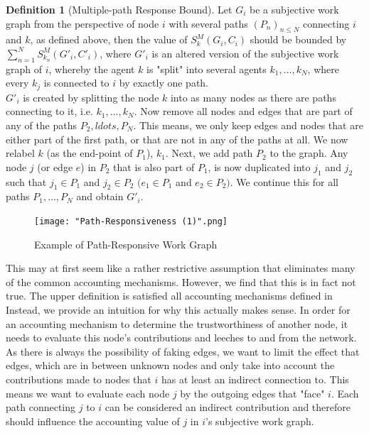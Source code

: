 \documentclass[11pt,a4paper]{report}
\theoremstyle{definition}
\newtheorem{definition}{Definition}[section]
\theoremstyle{theorem}
\theoremstyle{proposition}
\theoremstyle{corollary}
\theoremstyle{lemma}
\theoremstyle{example}
\theoremstyle{remark}
\begin{document}
\begin{definition}[Multiple-path Response Bound]
Let $G_i$ be a subjective work graph from the perspective of node $i$ with several paths $(P_n)_{n\leq{}N}$ connecting $i$ and $k$, as defined above, then the value of $S^M_k(G_i,C_i)$ should be bounded by $\sum\limits_{n=1}^{N}S^M_{k_n}(G'_i,C'_i)$, where $G'_i$ is an altered version of the subjective work graph of $i$, whereby the agent $k$ is "split" into several agents $k_{1},\ldots,k_{N}$, where every $k_j$ is connected to $i$ by exactly one path. \vspace{1em}\\

\noindent{}$G'_i$ is created by splitting the node $k$ into as many nodes as there are paths connecting to it, i.e. $k_1,\ldots,k_N$. Now remove all nodes and edges that are part of any of the paths $P_2,ldots,P_N$. This means, we only keep edges and nodes that are either part of the first path, or that are not in any of the paths at all. We now relabel $k$ (as the end-point of $P_1$), $k_1$. Next, we add path $P_2$ to the graph. Any node $j$ (or edge $e$) in $P_2$ that is also part of $P_1$, is now duplicated into $j_1$ and $j_2$ such that $j_1\in{}P_1$ and $j_2\in{}P_2$ $(e_1\in{}P_1$ and $e_2\in{}P_2)$. We continue this for all paths $P_1,\ldots,P_N$ and obtain $G'_i$. 
\end{definition}

\begin{figure}[H]
\begin{center}
\texttt{[image: "Path-Responsiveness (1)".png]}
\caption{Example of Path-Responsive Work Graph}
\label{fig:Example of Path-Responsive Work Graph}
\end{center}
\end{figure}

\noindent{}This may at first seem like a rather restrictive assumption that eliminates many of the common accounting mechanisms. However, we find that this is in fact not true. The upper definition is satisfied all accounting mechanisms defined in \cite{Hybrid Transitive Trust Mechanisms} Instead, we provide an intuition for why this actually makes sense. In order for an accounting mechanism to determine the trustworthiness of another node, it needs to evaluate this node's contributions and leeches to and from the network. As there is always the possibility of faking edges, we want to limit the effect that edges, which are in between unknown nodes and only take into account the contributions made to nodes that $i$ has at least an indirect connection to. This means we want to evaluate each node $j$ by the outgoing edges that "face" $i$. Each path connecting $j$ to $i$ can be considered an indirect contribution and therefore should influence the accounting value of $j$ in $i$'s subjective work graph. \vspace{1em}\\
\end{document}
